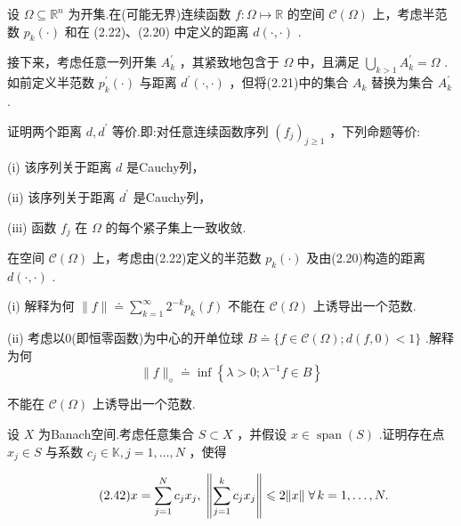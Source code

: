 \begin{rbhw}
设 $\Omega  \subseteq  {\mathbb{R}}^{n}$ 为开集.在(可能无界)连续函数 $f : \Omega  \mapsto  \mathbb{R}$ 的空间 $\mathcal{C}\left( \Omega \right)$ 上，考虑半范数 ${p}_{k}\left( \cdot \right)$ 和在 (2.22)、(2.20) 中定义的距离 $d\left( {\cdot , \cdot  }\right)$ .

接下来，考虑任意一列开集 ${A}_{k}^{\prime }$ ，其紧致地包含于 $\Omega$ 中，且满足 $\mathop{\bigcup }\limits_{{k > 1}}{A}_{k}^{\prime } = \Omega$ .如前定义半范数 ${p}_{k}^{\prime }\left( \cdot \right)$ 与距离 ${d}^{\prime }\left( {\cdot , \cdot  }\right)$ ，但将(2.21)中的集合 ${A}_{k}$ 替换为集合 ${A}_{k}^{\prime }$ .

证明两个距离 $d,{d}^{\prime }$ 等价.即:对任意连续函数序列 ${\left( {f}_{j}\right) }_{j \geq  1}$ ，下列命题等价:

(i) 该序列关于距离 $d$ 是Cauchy列，

(ii) 该序列关于距离 ${d}^{\prime }$ 是Cauchy列，

(iii) 函数 ${f}_{j}$ 在 $\Omega$ 的每个紧子集上一致收敛.
\end{rbhw}

\begin{rbhw}
在空间 $\mathcal{C}\left( \Omega \right)$ 上，考虑由(2.22)定义的半范数 ${p}_{k}\left( \cdot \right)$ 及由(2.20)构造的距离 $d\left( {\cdot , \cdot  }\right)$ .

(i) 解释为何 $\| f\|  \doteq  \mathop{\sum }\limits_{{k = 1}}^{\infty }{2}^{-k}{p}_{k}\left( f\right)$ 不能在 $\mathcal{C}\left( \Omega \right)$ 上诱导出一个范数.

(ii) 考虑以0(即恒零函数)为中心的开单位球 $B \doteq  \{ f \in  \mathcal{C}\left( \Omega \right) ;d\left( {f,0}\right)  < 1\}$ .解释为何
\[
\| f{\| }_{\diamond } \doteq  \inf \left\{  {\lambda  > 0;{\lambda }^{-1}f \in  B}\right\}
\]

不能在 $\mathcal{C}\left( \Omega \right)$ 上诱导出一个范数.
\end{rbhw}

\begin{rbhw}
设 $X$ 为Banach空间.考虑任意集合 $S \subset  X$ ，并假设 $x \in  \operatorname{span}\left( S\right)$ .证明存在点 ${x}_{j} \in  S$ 与系数 ${c}_{j} \in  \mathbb{K},j = 1,\ldots ,N$ ，使得

\begin{equation}\tag{2.42}
x = \mathop{\sum }\limits_{{j = 1}}^{N}{c}_{j}{x}_{j},\;\norm{\mathop{\sum }\limits_{{j = 1}}^{k}{c}_{j}{x}_{j}} \leqslant  2\| x\| \;\forall\,k = 1,\ldots ,N.
\end{equation}
\end{rbhw}

